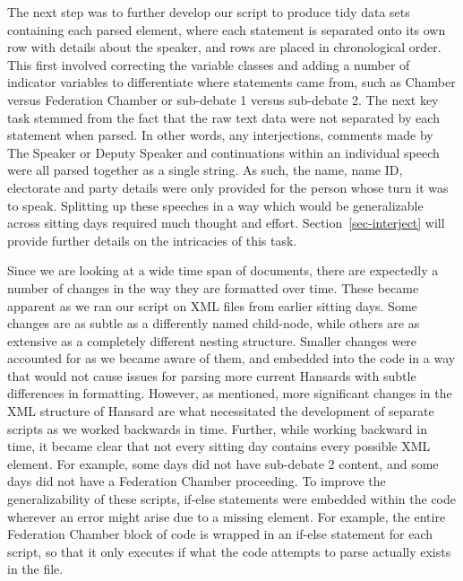 \documentclass[
  letterpaper,
  DIV=11,
  numbers=noendperiod]{scrartcl}
\begin{document}
The next step was to further develop our script to produce tidy data
sets containing each parsed element, where each statement is separated
onto its own row with details about the speaker, and rows are placed in
chronological order. This first involved correcting the variable classes
and adding a number of indicator variables to differentiate where
statements came from, such as Chamber versus Federation Chamber or
sub-debate 1 versus sub-debate 2. The next key task stemmed from the
fact that the raw text data were not separated by each statement when
parsed. In other words, any interjections, comments made by The Speaker
or Deputy Speaker and continuations within an individual speech were all
parsed together as a single string. As such, the name, name ID,
electorate and party details were only provided for the person whose
turn it was to speak. Splitting up these speeches in a way which would
be generalizable across sitting days required much thought and effort.
Section~\ref{sec-interject} will provide further details on the
intricacies of this task.

Since we are looking at a wide time span of documents, there are
expectedly a number of changes in the way they are formatted over time.
These became apparent as we ran our script on XML files from earlier
sitting days. Some changes are as subtle as a differently named
child-node, while others are as extensive as a completely different
nesting structure. Smaller changes were accounted for as we became aware
of them, and embedded into the code in a way that would not cause issues
for parsing more current Hansards with subtle differences in formatting.
However, as mentioned, more significant changes in the XML structure of
Hansard are what necessitated the development of separate scripts as we
worked backwards in time. Further, while working backward in time, it
became clear that not every sitting day contains every possible XML
element. For example, some days did not have sub-debate 2 content, and
some days did not have a Federation Chamber proceeding. To improve the
generalizability of these scripts, if-else statements were embedded
within the code wherever an error might arise due to a missing element.
For example, the entire Federation Chamber block of code is wrapped in
an if-else statement for each script, so that it only executes if what
the code attempts to parse actually exists in the file.
\end{document}
